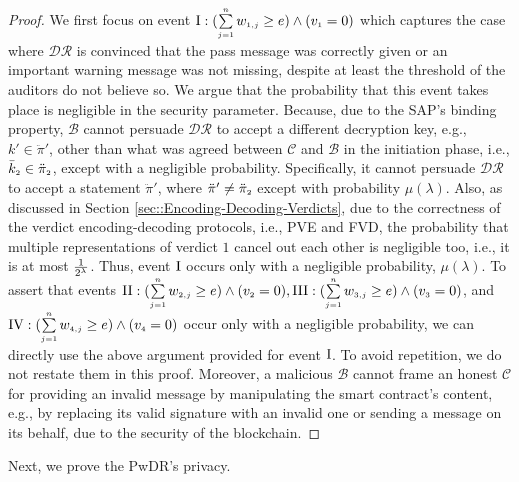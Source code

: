 \vspace{-4mm}
\begin{proof}
%
We first focus on event $\text{\MakeUppercase{\romannumeral 1}}:  (\sum\limits_{\st j=1}^{\st n}w_{\st 1,j}\geq e) \wedge ( v_{\st 1}=0)$ which captures the case where  $\mathcal{DR}$ is convinced that the pass message was correctly given or an important warning message was not missing, despite at least the threshold of the auditors do not believe so. We argue that the probability that this event takes place is negligible in the security parameter. Because, due to the SAP's binding property, $\mathcal{B}$  cannot persuade $\mathcal{DR}$ to accept a different decryption key, e.g., $k'\in \ddot\pi'$, other than what was agreed between $\mathcal{C}$ and $\mathcal{B}$ in the initiation phase, i.e., $\bar k_{\scriptscriptstyle 2}\in \ddot\pi_{\scriptscriptstyle 2}$, except with a negligible probability. Specifically, it cannot persuade  $\mathcal{DR}$ to accept a statement $\ddot \pi'$, where $\ddot \pi'\neq \ddot \pi_{\scriptscriptstyle 2}$ except with   probability $\mu(\lambda)$. Also, as discussed in Section \ref{sec::Encoding-Decoding-Verdicts}, due to the correctness of the verdict encoding-decoding protocols, i.e., PVE and FVD, the probability that multiple representations of verdict  $1$ cancel out each other is negligible too, i.e., it is at most $\frac{1}{2^{\scriptscriptstyle \lambda}}$. Thus,  event $\text{\MakeUppercase{\romannumeral 1}}$ occurs only with a negligible probability, $\mu(\lambda)$. To  assert that   events $\text{\MakeUppercase{\romannumeral 2}}: ( \sum\limits_{\st j=1}^{\st n}w_{\st 2,j}\geq e) \wedge ( v_{\st 2}=0), \text{\MakeUppercase{\romannumeral 3}}: ( \sum\limits_{\st j=1}^{\st n}w_{\st 3,j}\geq e) \wedge ( v_{\st 3}=0)$, and $\text{\MakeUppercase{\romannumeral 4}}: ( \sum\limits_{\st j=1}^{\st n}w_{\st 4,j}\geq e) \wedge ( v_{\st 4}=0)$ occur only with a  negligible probability, we can directly use the above argument provided for event $\text{\MakeUppercase{\romannumeral 1}}$. To avoid repetition, we do not restate them in this proof.  Moreover, a malicious $\mathcal{B}$ cannot frame an honest $\mathcal{C}$ for providing an invalid message by manipulating the smart contract’s content,  e.g., by replacing its valid signature with an invalid one or sending a message on its behalf, due to the security of the blockchain.
\end{proof}

\vspace{-2mm}
Next, we prove the PwDR's privacy. %

